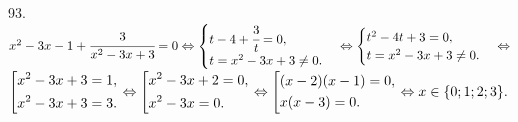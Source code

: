 93. $x^2-3x-1+\cfrac{3}{x^2-3x+3}=0\Leftrightarrow \begin{cases}t-4+\cfrac{3}{t}=0,\\ t=x^2-3x+3\neq0.\end{cases}\Leftrightarrow
\begin{cases}t^2-4t+3=0,\\ t=x^2-3x+3\neq0.\end{cases}\Leftrightarrow$\\$\left[\begin{gathered}
     x^2-3x+3=1,\hfill\\
     x^2-3x+3=3.\hfill \end{gathered}\right.\Leftrightarrow\left[\begin{gathered}
     x^2-3x+2=0,\hfill\\
     x^2-3x=0.\hfill \end{gathered}\right.\Leftrightarrow\left[\begin{gathered}
     (x-2)(x-1)=0,\hfill\\
     x(x-3)=0.\hfill \end{gathered}\right.\Leftrightarrow x\in\{0;1;2;3\}.$\\

